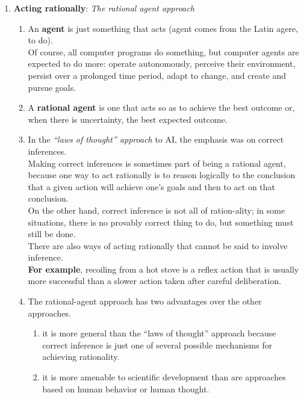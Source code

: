 \begin{enumerate}[itemsep=0.2cm]
    \item \textbf{Acting rationally}: \textit{The rational agent approach}
    \begin{enumerate}
        \item An \textbf{agent} is just something that acts (agent comes from the Latin agere, to do).\\
        Of course, all computer programs do something, but computer agents are expected to do more: operate autonomously, perceive their environment, persist over a prolonged time period, adapt to change, and create and pursue goals. 
        
        \item A \textbf{rational agent} is one that acts so as to achieve the best outcome or, when there is uncertainty, the best expected outcome.

        \item In the \textit{“laws of thought” approach} to AI, the emphasis was on correct inferences.\\
        Making correct inferences is sometimes part of being a rational agent, because one way to act rationally is to reason logically to the conclusion that a given action will achieve one’s goals and then to act on that conclusion.\\
        On the other hand, correct inference is not all of ration-ality; in some situations, there is no provably correct thing to do, but something must still be done.\\
        There are also ways of acting rationally that cannot be said to involve inference.\\
        \textbf{For example}, recoiling from a hot stove is a reflex action that is usually more successful than a slower action taken after careful deliberation.

        \item The rational-agent approach has two advantages over the other approaches. 
        \begin{enumerate}
            \item it is more general than the “laws of thought” approach because correct inference is just one of several possible mechanisms for achieving rationality. 

            \item it is more amenable to scientific development than are approaches based on human behavior or human thought. 
        \end{enumerate}


\end{enumerate}
\end{enumerate}

